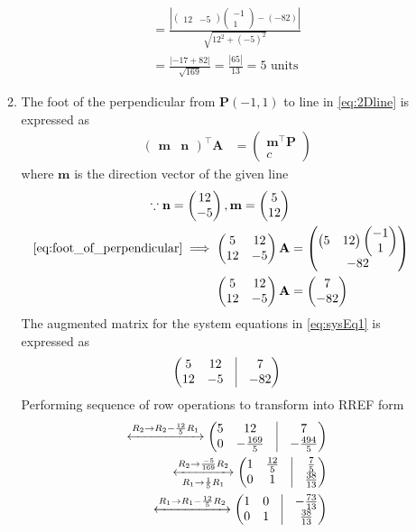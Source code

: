 \documentclass[12pt]{article}
\providecommand{\brak}[1]{\ensuremath{\left(#1\right)}}
\newcommand{\myvec}[1]{\ensuremath{\begin{pmatrix}#1\end{pmatrix}}}
\providecommand{\abs}[1]{\left\vert#1\right\vert}
\let\vec\mathbf
\begin{document}
\begin{enumerate}
\begin{enumerate}
\begin{align}
	= \frac{\abs{  \myvec{12 & -5 }\myvec{-1 \\ 1}-\brak{-82} }}{\sqrt{12^2+\brak{-5}^2}} \\	
	= \frac{\abs{  -17 + 82 }}{\sqrt{169}}	
	= \frac{\abs{65 }}{13}
	= 5 \text{ units }
\end{align}
\item The foot of the perpendicular from $\vec{P}(-1,1)$ to line in \eqref{eq:2Dline} is expressed as
\begin{align}
	\label{eq:foot_of_perpendicular}
	\myvec{\vec{m} & \vec{n}}^\top\vec{A} &= 
	   \myvec{
              \vec{m}^\top\vec{P}\\
	      c
	      }
\end{align}
where $\vec{m}$ is the direction vector of the given line
\begin{align}
    \because \vec{n} = \myvec{ 12 \\ -5},   
    \vec{m} = \myvec{ 5 \\ 12} \\ 
	\eqref{eq:foot_of_perpendicular} \implies \myvec{5&12 \\ 12 & -5}\vec{A} &= \myvec{\myvec{5 & 12}\myvec{-1 \\ 1}\\ -82} \\
	\label{eq:sysEq1}
	\myvec{5&12 \\ 12 & -5}\vec{A} &= \myvec{7 \\ -82} 
\end{align}	
The augmented matrix for the system equations in \eqref{eq:sysEq1} is expressed as
\begin{align}
	\myvec{5&12 & \vrule & 7 \\ 12 & -5 & \vrule & -82} 
\end{align}
Performing sequence of row operations to transform into RREF form
\begin{align}
        \xleftrightarrow[]{{R_2\rightarrow R_2-\frac{12}{5}R_1}}  
	\myvec{5&12 & \vrule & 7 \\ 0 & -\frac{169}{5} & \vrule & -\frac{494}{5}} \\
	\xleftrightarrow[{R_1\rightarrow \frac{1}{5}}R_1]{{R_2\rightarrow \frac{-5}{169}R_2}}  
	\myvec{1 & \frac{12}{5} & \vrule & \frac{7}{5} \\ 0 & 1 & \vrule & \frac{38}{13}} \\
	\xleftrightarrow[]{{R_1\rightarrow R_1-\frac{12}{5}R_2}}  
	\myvec{1 & 0 & \vrule & -\frac{73}{13} \\ 0 & 1 & \vrule & \frac{38}{13}} \\

\end{align}
\end{enumerate}
\end{enumerate}
\end{document}
